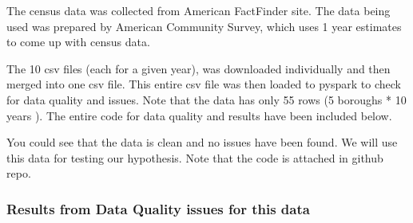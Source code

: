 \documentclass{article}
\begin{document}
The census data was collected from American FactFinder site. The data being used was prepared by American Community Survey, which uses 1 year estimates to come up with census data.

The 10 csv files (each for a given year), was downloaded individually and then merged into one csv file. This entire csv file was then loaded to pyspark to check for data quality and issues. Note that the data has only 55 rows (5 boroughs * 10 years ). The entire code for data quality and results have been included below.

You could see that the data is clean and no issues have been found. We will use this data for testing our hypothesis. Note that the code is attached in github repo.

\subsubsection*{Results from Data Quality issues for this data}
\end{document}
